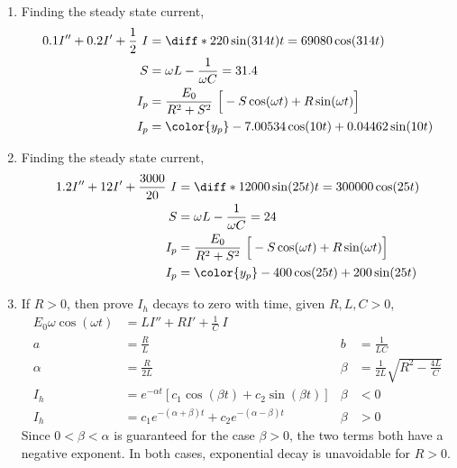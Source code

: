 \begin{enumerate}
    \item Finding the steady state current,
          \begin{align}
              0.1I'' + 0.2I' + \frac{1}{2}\ I & = \diff* {220\sin(314t)}{t} = 69080\cos(314t)                               \\
              S                               & = \omega L - \frac{1}{\omega C} = 31.4                                      \\
              I_{p}                           & = \frac{E_{0}}{R^{2} + S^{2}}\ \Big[-S\cos(\omega t) + R\sin(\omega t)\Big] \\
              I_{p}                           & = {\color{y_p} -7.00534\cos(10t) + 0.04462 \sin(10t) }                      \\
          \end{align}
    \item Finding the steady state current,
          \begin{align}
              1.2I'' + 12I' + \frac{3000}{20}\ I & = \diff* {12000\sin(25t)}{t} = 300000\cos(25t)                              \\
              S                                  & = \omega L - \frac{1}{\omega C} = 24                                        \\
              I_{p}                              & = \frac{E_{0}}{R^{2} + S^{2}}\ \Big[-S\cos(\omega t) + R\sin(\omega t)\Big] \\
              I_{p}                              & = {\color{y_p} -400\cos(25t) + 200\sin(25t) }                               \\
          \end{align}

    \item If $ R > 0 $, then prove $ I_{h} $ decays to zero with time, given $ R, L, C > 0 $,
          \begin{align}
              E_{0}\omega\cos(\omega t) & = LI'' + RI' + \frac{1}{C}\ I                                                                                   \\
              a                         & = \frac{R}{L}                                               & b     & = \frac{1}{LC}                            \\
              \alpha                    & = \frac{R}{2L}                                              & \beta & = \frac{1}{2L}\sqrt{R^{2} - \frac{4L}{C}} \\
              I_{h}                     & = e^{-\alpha t}[c_{1}\cos(\beta t) + c_{2}\sin(\beta t)]    & \beta & < 0                                       \\
              I_{h}                     & = c_{1}e^{-(\alpha + \beta)t} + c_{2}e^{-(\alpha - \beta)t} & \beta & > 0
          \end{align}
          Since $ 0 < \beta < \alpha $ is guaranteed for the case $ \beta > 0 $, the two terms both have a
          negative exponent. In both cases, exponential decay is unavoidable for $ R > 0 $.


\end{enumerate}
